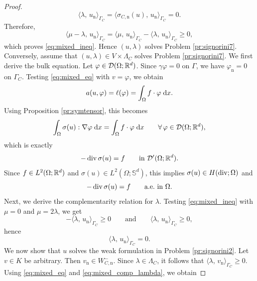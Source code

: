 \begin{proof}
	\begin{equation*}
		\langle \lambda,\,u_{\mathrm n}\rangle_{\Gamma_C}
		=
		\langle \sigma_{C, \mathrm n}(u),\,u_{\mathrm n}\rangle_{\Gamma_C}
		=
		0.
	\end{equation*}
	Therefore,
	\begin{equation*}
		\langle \mu-\lambda,\,u_{\mathrm n}\rangle_{\Gamma_C}
		=
		\langle \mu,\,u_{\mathrm n}\rangle_{\Gamma_C}
		-
		\langle \lambda,\,u_{\mathrm n}\rangle_{\Gamma_C}
		\ge 0,
	\end{equation*}
	which proves \eqref{eq:mixed_ineq}. Hence $(u,\lambda)$ solves Problem \ref{pr:signorini7}. Conversely, assume that $(u,\lambda)\in V\times \Lambda_C$ solves Problem \ref{pr:signorini7}. We first derive the bulk equation. Let $\varphi\in \mathcal D(\Omega;{\mathbb R}^d)$. Since $\gamma\varphi=0$ on $\Gamma$, we have $\varphi_\mathrm{n} = 0$ on $\Gamma_C$. Testing \eqref{eq:mixed_eq} with $v=\varphi$, we obtain
	\begin{equation*}
		a(u,\varphi)=\ell(\varphi)=\int_\Omega f\cdot\varphi\;{{\mathrm{d}} x}.
	\end{equation*}
	Using Proposition \ref{pr:symtensor}, this becomes
	\begin{equation*}
		\int_\Omega \sigma(u):\nabla\varphi\;{{\mathrm{d}} x}
		=
		\int_\Omega f\cdot\varphi\;{{\mathrm{d}} x}
		\qquad\forall\,\varphi\in \mathcal D(\Omega;{\mathbb R}^d),
	\end{equation*}
	which is exactly
	\begin{equation*}
		-\diver\sigma(u)=f
		\qquad\text{in }\mathcal D'(\Omega;\R^d).
	\end{equation*}
	Since $f\in L^2(\Omega;{\mathbb R}^d)$ and $\sigma(u)\in L^2(\Omega;\mathbb S^d)$, this implies $\sigma(u)\in H(\diver;\Omega)$ and
	\begin{equation*}
		-\diver\sigma(u)=f
		\qquad\text{a.e.\ in }\Omega.
	\end{equation*}
	Next, we derive the complementarity relation for $\lambda$. Testing \eqref{eq:mixed_ineq} with $\mu=0$ and $\mu=2\lambda$, we get
	\begin{equation*}
		-\langle \lambda,\,u_{\mathrm n}\rangle_{\Gamma_C}\ge 0
		\qquad\text{and}\qquad
		\langle \lambda,\,u_{\mathrm n}\rangle_{\Gamma_C}\ge 0,
	\end{equation*}
	hence
	\begin{equation}\label{eq:mixed_comp_lambda}
		\langle \lambda,\,u_{\mathrm n}\rangle_{\Gamma_C}=0.
	\end{equation}
	We now show that $u$ solves the weak formulation in Problem \ref{pr:signorini2}. Let $v\in K$ be arbitrary. Then $v_{\mathrm n}\in W_{C,\mathrm n}^-$. Since $\lambda\in \Lambda_C$, it follows that $\langle \lambda,\,v_{\mathrm n}\rangle_{\Gamma_C}\ge 0$. Using \eqref{eq:mixed_eq} and \eqref{eq:mixed_comp_lambda}, we obtain

\end{proof}
